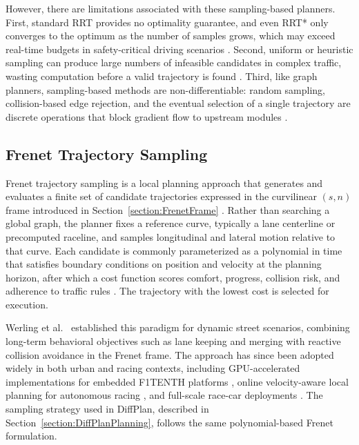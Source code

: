 However, there are limitations associated with these sampling-based planners.
First, standard RRT provides no optimality guarantee, and even RRT* only converges to the optimum as the number of samples grows, which may exceed real-time budgets in safety-critical driving scenarios \cite{orthey_SamplingBasedMotionPlanning_2023}.
Second, uniform or heuristic sampling can produce large numbers of infeasible candidates in complex traffic, wasting computation before a valid trajectory is found \cite{zhang_IntegratingAlgorithmicSamplingBased_2022, wursching_SamplingBasedOptimalTrajectory_2021}.
Third, like graph planners, sampling-based methods are non-differentiable: random sampling, collision-based edge rejection, and the eventual selection of a single trajectory are discrete operations that block gradient flow to upstream modules \cite{koch_DifferentiableInterpretablePath_2025, karkus_DiffStackDifferentiableModular_2022}.

\subsection{Frenet Trajectory Sampling}
\label{subsection:FrenetSampling}

Frenet trajectory sampling is a local planning approach that generates and evaluates a finite set of candidate trajectories expressed in the curvilinear $(s, n)$ frame introduced in Section~\ref{section:FrenetFrame} \cite{werling_OptimalTrajectoryGeneration_2010, gonzalez_ReviewMotionPlanning_2016}.
Rather than searching a global graph, the planner fixes a reference curve, typically a lane centerline or precomputed raceline, and samples longitudinal and lateral motion relative to that curve.
Each candidate is commonly parameterized as a polynomial in time that satisfies boundary conditions on position and velocity at the planning horizon, after which a cost function scores comfort, progress, collision risk, and adherence to traffic rules \cite{werling_OptimalTrajectoryGeneration_2010}.
The trajectory with the lowest cost is selected for execution.

Werling et al.\ \cite{werling_OptimalTrajectoryGeneration_2010} established this paradigm for dynamic street scenarios, combining long-term behavioral objectives such as lane keeping and merging with reactive collision avoidance in the Frenet frame.
The approach has since been adopted widely in both urban and racing contexts, including GPU-accelerated implementations for embedded F1TENTH platforms \cite{muzzini_GPUImplementationFrenet_2024}, online velocity-aware local planning for autonomous racing \cite{langmann_OnlineVelocityProfile_2025}, and full-scale race-car deployments \cite{ogretmen_local_2025}.
The sampling strategy used in DiffPlan, described in Section~\ref{section:DiffPlanPlanning}, follows the same polynomial-based Frenet formulation.

